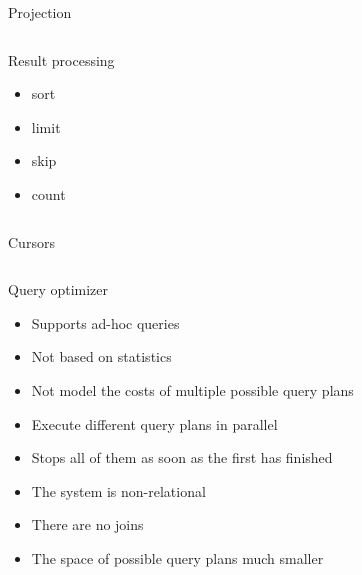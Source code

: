 \documentclass[sans]{beamer}
\begin{document}
\begin{frame}{Projection}
	\inputminted[fontsize=\footnotesize]{js}{codes/projection.js}
\end{frame}

\begin{frame}{Result processing}
	\begin{itemize}
		\item sort
		\item limit
		\item skip
		\item count
	\end{itemize}
	\inputminted{js}{codes/proccesing.js}
\end{frame}

\begin{frame}{Cursors}
	\inputminted{js}{codes/cursor.js}
\end{frame}

\begin{frame}{Query optimizer}
	\begin{itemize}
		\item Supports ad-hoc queries
		\vspace{1cm}
		\item Not based on statistics
		\item Not model the costs of multiple possible query plans
		\vspace{1cm}
		\item Execute different query plans in parallel
		\item Stops all of them as soon as the first has finished
		\vspace{1cm}
		\item The system is non-relational
		\item There are no joins
		\item The space of possible query plans much smaller
	\end{itemize}
\end{frame}
\end{document}
